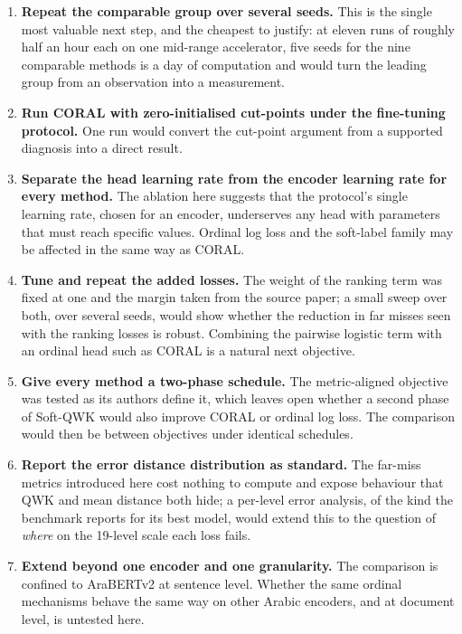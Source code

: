 \begin{enumerate}
\item \textbf{Repeat the comparable group over several seeds.} This is the single most valuable
next step, and the cheapest to justify: at eleven runs of roughly half an hour each on one
mid-range accelerator, five seeds for the nine comparable methods is a day of computation and
would turn the leading group from an observation into a measurement.

\item \textbf{Run CORAL with zero-initialised cut-points under the fine-tuning protocol.} One
run would convert the cut-point argument from a supported diagnosis into a direct result.

\item \textbf{Separate the head learning rate from the encoder learning rate for every method.}
The ablation here suggests that the protocol's single learning rate, chosen for an encoder,
underserves any head with parameters that must reach specific values. Ordinal log loss and the
soft-label family may be affected in the same way as CORAL.

\item \textbf{Tune and repeat the added losses.} The weight of the ranking term was fixed at one
and the margin taken from the source paper; a small sweep over both, over several seeds, would
show whether the reduction in far misses seen with the ranking losses is robust. Combining the
pairwise logistic term with an ordinal head such as CORAL is a natural next objective.

\item \textbf{Give every method a two-phase schedule.} The metric-aligned objective was tested
as its authors define it, which leaves open whether a second phase of Soft-QWK would also
improve CORAL or ordinal log loss. The comparison would then be between objectives under
identical schedules.

\item \textbf{Report the error distance distribution as standard.} The far-miss metrics
introduced here cost nothing to compute and expose behaviour that QWK and mean distance both
hide; a per-level error analysis, of the kind the benchmark reports for its best model, would
extend this to the question of \emph{where} on the 19-level scale each loss fails.

\item \textbf{Extend beyond one encoder and one granularity.} The comparison is confined to
AraBERTv2 at sentence level. Whether the same ordinal mechanisms behave the same way on other
Arabic encoders, and at document level, is untested here.
\end{enumerate}

